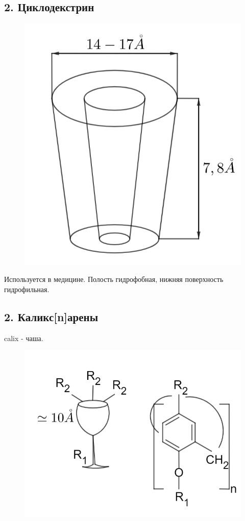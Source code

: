 \begin{lecture}
\begin{lecSection}[Кавитанты]
\subsection{2. Циклодекстрин}
	
		\begin{figure}[H]
		
		\centering\includegraphics[width=0.6\linewidth]{lecture_09/pic3}
		
	\end{figure}

\par Используется в медицине. Полость гидрофобная, нижняя поверхность гидрофильная.

\subsection{2. Каликс[n]арены}

calix - чаша.

	\begin{figure}[H]
	\begin{minipage}[h]{0.49\linewidth}
		\centering\includegraphics[width=\linewidth]{lecture_09/pic4}
		

\end{minipage}
\end{figure}
\end{lecSection}
\end{lecture}

